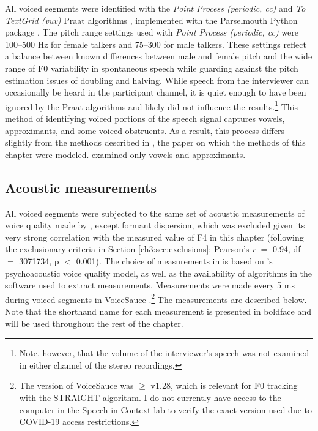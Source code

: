 All voiced segments were identified with the \textit{Point Process (periodic, cc)} and \textit{To TextGrid (vuv)} Praat algorithms \citep{boersma_2021_praat}, implemented with the Parselmouth Python package \citep{jadoul_2018_parselmouth}. The pitch range settings used with \textit{Point Process (periodic, cc)} were 100--500 Hz for female talkers and 75--300 for male talkers. These settings reflect a balance between known differences between male and female pitch \citep{simpson_2009_phonetic} and the wide range of F0 variability in spontaneous speech while guarding against the pitch estimation issues of doubling and halving. While speech from the interviewer can occasionally be heard in the participant channel, it is quiet enough to have been ignored by the Praat algorithms and likely did not influence the results.\footnote{Note, however, that the volume of the interviewer's speech was not examined in either channel of the stereo recordings.} This method of identifying voiced portions of the speech signal captures vowels, approximants, and some voiced obstruents. As a result, this process differs slightly from the methods described in \citet{lee_2019_acoustic}, the paper on which the methods of this chapter were modeled. \citet{lee_2019_acoustic} examined only vowels and approximants. 

\subsection{Acoustic measurements}\label{ch3:sec:acoustic}

All voiced segments were subjected to the same set of acoustic measurements of voice quality made by \citet{lee_2019_acoustic}, except formant dispersion, which was excluded given its very strong correlation with the measured value of F4 in this chapter (following the exclusionary criteria in Section \ref{ch3:sec:exclusions}: Pearson's \textit{r} $=$ 0.94, df $=$ 3071734, p $<$ 0.001). The choice of measurements in \citet{lee_2019_acoustic} is based on \citeauthor{kreiman_2014_theory}'s \citeyearpar{kreiman_2014_theory} psychoacoustic voice quality model, as well as the availability of algorithms in the software used to extract measurements. Measurements were made every 5 ms during voiced segments in VoiceSauce \citep[][]{shue_2011_voicesauce}.\footnote{The version of VoiceSauce was $\geq$ v1.28, which is relevant for F0 tracking with the STRAIGHT algorithm. I do not currently have access to the computer in the Speech-in-Context lab to verify the exact version used due to COVID-19 access restrictions.} The measurements are described below. Note that the shorthand name for each measurement is presented in boldface and will be used throughout the rest of the chapter. 

